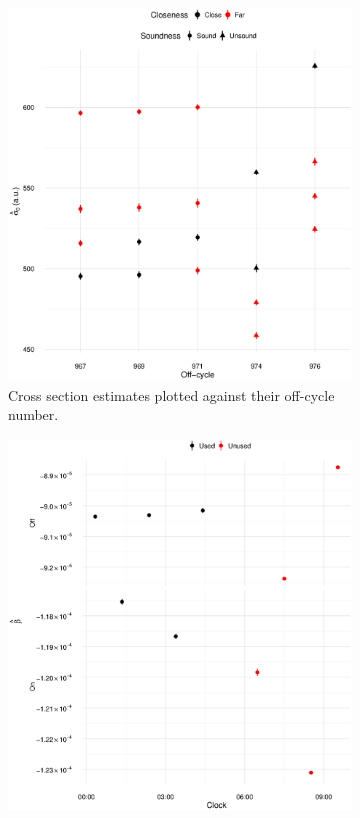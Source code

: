 \documentclass[reprint]{revtex4-1}
\newcommand{\scl}{.4}
\begin{document}
\begin{figure}
\begin{subfigure}{.5\textwidth}
\includegraphics[scale=\scl]{img/Cross-Section2012_all.eps}
\caption{Cross section estimates plotted against their off-cycle number.\label{fig:CS-all}}
\end{subfigure}
\begin{subfigure}{.5\textwidth}
\includegraphics[scale=\scl]{img/Slopes-2012_big.eps}

\end{subfigure}
\end{figure}
\end{document}
